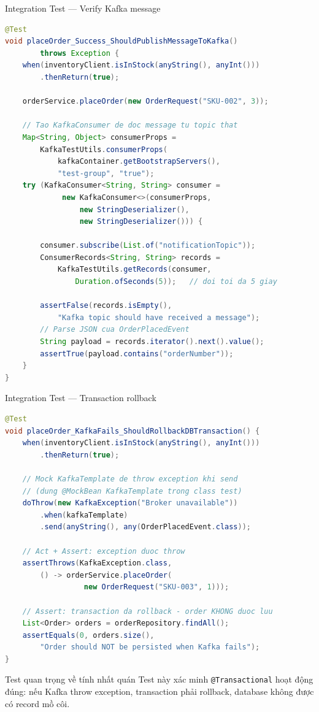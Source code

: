 \documentclass[aspectratio=169,10pt]{beamer}
\begin{document}
\begin{frame}[fragile]{Integration Test --- Verify Kafka message}
\begin{lstlisting}[language=Java]
@Test
void placeOrder_Success_ShouldPublishMessageToKafka()
        throws Exception {
    when(inventoryClient.isInStock(anyString(), anyInt()))
        .thenReturn(true);

    orderService.placeOrder(new OrderRequest("SKU-002", 3));

    // Tao KafkaConsumer de doc message tu topic that
    Map<String, Object> consumerProps =
        KafkaTestUtils.consumerProps(
            kafkaContainer.getBootstrapServers(),
            "test-group", "true");
    try (KafkaConsumer<String, String> consumer =
             new KafkaConsumer<>(consumerProps,
                 new StringDeserializer(),
                 new StringDeserializer())) {

        consumer.subscribe(List.of("notificationTopic"));
        ConsumerRecords<String, String> records =
            KafkaTestUtils.getRecords(consumer,
                Duration.ofSeconds(5));   // doi toi da 5 giay

        assertFalse(records.isEmpty(),
            "Kafka topic should have received a message");
        // Parse JSON cua OrderPlacedEvent
        String payload = records.iterator().next().value();
        assertTrue(payload.contains("orderNumber"));
    }
}
\end{lstlisting}
\end{frame}

\begin{frame}[fragile]{Integration Test --- Transaction rollback}
\begin{lstlisting}[language=Java]
@Test
void placeOrder_KafkaFails_ShouldRollbackDBTransaction() {
    when(inventoryClient.isInStock(anyString(), anyInt()))
        .thenReturn(true);

    // Mock KafkaTemplate de throw exception khi send
    // (dung @MockBean KafkaTemplate trong class test)
    doThrow(new KafkaException("Broker unavailable"))
        .when(kafkaTemplate)
        .send(anyString(), any(OrderPlacedEvent.class));

    // Act + Assert: exception duoc throw
    assertThrows(KafkaException.class,
        () -> orderService.placeOrder(
                  new OrderRequest("SKU-003", 1)));

    // Assert: transaction da rollback - order KHONG duoc luu
    List<Order> orders = orderRepository.findAll();
    assertEquals(0, orders.size(),
        "Order should NOT be persisted when Kafka fails");
}
\end{lstlisting}

  \begin{alertblock}{Test quan trọng về tính nhất quán}
    Test này xác minh \texttt{@Transactional} hoạt động đúng:
    nếu Kafka throw exception, transaction phải rollback,
    database không được có record mồ côi.
  \end{alertblock}
\end{frame}
\end{document}
